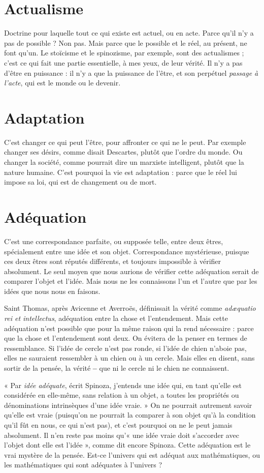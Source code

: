 \section{Actualisme}
Doctrine pour laquelle tout ce qui existe est actuel, ou en acte.
Parce qu’il n’y a pas de possible ? Non pas. Mais parce que le
possible et le réel, au présent, ne font qu’un. Le stoïcisme et le spinozisme, par
exemple, sont des actualismes ; c’est ce qui fait une partie essentielle, à mes
yeux, de leur vérité. Il n’y a pas d’être en puissance : il n’y a que la puissance de
l'être, et son perpétuel {\it passage à l'acte}, qui est le monde ou le devenir.

\section{Adaptation}
C’est changer ce qui peut l'être, pour affronter ce qui ne le
peut. Par exemple changer ses désirs, comme disait Descartes,
plutôt que l’ordre du monde. Ou changer la société, comme pourrait
dire un marxiste intelligent, plutôt que la nature humaine.
C’est pourquoi la vie est adaptation : parce que le réel lui impose sa loi, qui
est de changement ou de mort.

\section{Adéquation}
C’est une correspondance parfaite, ou supposée telle, entre
deux êtres, spécialement entre une idée et son objet. Correspondance
mystérieuse, puisque ces deux êtres sont réputés différents, et toujours
impossible à vérifier absolument. Le seul moyen que nous aurions de vérifier
cette adéquation serait de comparer l’objet et l’idée. Mais nous ne les
connaissons l’un et l’autre que par les idées que nous nous en faisons.

Saint Thomas, après Avicenne et Averroës, définissait la vérité comme {\it ad{\ae}quatio
rei et intellectus}, adéquation entre la chose et l’entendement. Mais cette
adéquation n’est possible que pour la même raison qui la rend nécessaire :
parce que la chose et l’entendement sont deux. On évitera de la penser en
termes de ressemblance. Si l’idée de cercle n’est pas ronde, si l’idée de chien
n’aboie pas, elles ne sauraient ressembler à un chien ou à un cercle. Mais elles en
disent, sans sortir de la pensée, la vérité {\bf --} que ni le cercle ni le chien ne
connaissent.

« Par {\it idée adéquate}, écrit Spinoza, j'entends une idée qui, en tant qu’elle est
considérée en elle-même, sans relation à un objet, a toutes les propriétés ou
dénominations intrinsèques d’une idée vraie. » On ne pourrait autrement
savoir qu’elle est vraie (puisqu'on ne pourrait la comparer à son objet qu’à la
condition qu’il fût en nous, ce qui n’est pas), et c’est pourquoi on ne le peut
jamais absolument. Il n’en reste pas moins qu’« une idée vraie doit s’accorder
avec l’objet dont elle est l’idée », comme dit encore Spinoza. Cette adéquation
est le vrai mystère de la pensée. Est-ce l’univers qui est adéquat aux mathématiques,
ou les mathématiques qui sont adéquates à l’univers ?

